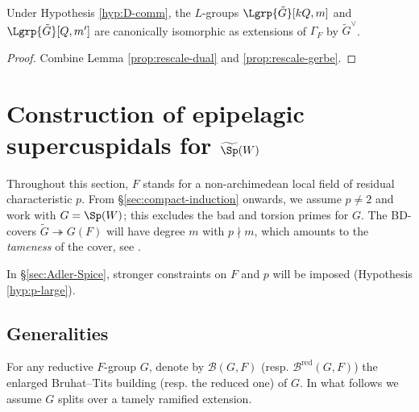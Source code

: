 \documentclass[a4paper,10pt]{article}
\begin{document}
\begin{theorem}\label{prop:rescale-L}
	Under Hypothesis \ref{hyp:D-comm}, the $L$-groups $\Lgrp{\tilde{G}}[kQ, m]$ and $\Lgrp{\tilde{G}}[Q, m']$ are canonically isomorphic as extensions of $\Gamma_F$ by $\tilde{G}^\vee$.
\end{theorem}
\begin{proof}
	Combine Lemma \ref{prop:rescale-dual} and \ref{prop:rescale-gerbe}.
\end{proof}

\section{Construction of epipelagic supercuspidals for \texorpdfstring{$\widetilde{\Sp}(W)$}{tilde Sp(W)}} \label{sec:construction-rep}
Throughout this section, $F$ stands for a non-archimedean local field of residual characteristic $p$. From \S\ref{sec:compact-induction} onwards, we assume $p \neq 2$ and work with $G = \Sp(W)$; this excludes the bad and torsion primes \cite[I.4]{SS70} for $G$. The BD-covers $\tilde{G} \twoheadrightarrow G(F)$ will have degree $m$ with $p \nmid m$, which amounts to the \emph{tameness} of the cover, see \cite[\S 4]{GG}.

In \S\ref{sec:Adler-Spice}, stronger constraints on $F$ and $p$ will be imposed (Hypothesis \ref{hyp:p-large}).

\subsection{Generalities}\label{sec:MP-generalities}
For any reductive $F$-group $G$, denote by $\mathcal{B}(G, F)$ (resp. $\mathcal{B}^\text{red}(G, F)$) the enlarged Bruhat--Tits building (resp. the reduced one) of $G$. In what follows we assume $G$ splits over a tamely ramified extension. 
\end{document}
